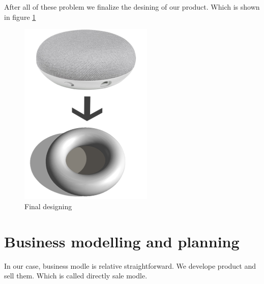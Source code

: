 \documentclass[12pt,twoside]{article}
\begin{document}
After all of these problem we finalize the desining of our product. Which is shown in figure \ref{fig:Final designing}

\begin{figure}[!htb]
\centering
\includegraphics[height=0.6\textwidth]{safedock.png}
\caption{Final designing}
\label{fig:Final designing}
\end{figure}






\section{Business modelling and planning}
\label{sec:Business modelling and planning}
In our case, business modle is relative straightforward. We develope product and sell them. Which is called directly sale modle.
\end{document}
